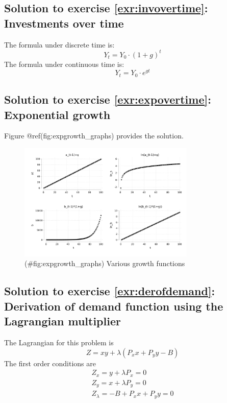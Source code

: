 \documentclass[
  12pt,
  oneside]{book}
\theoremstyle{definition}
\theoremstyle{definition}
\theoremstyle{definition}
\theoremstyle{definition}
\theoremstyle{remark}
\begin{document}
\subsection*{Solution to exercise \ref{exr:invovertime}: Investments over time}\label{sol:invovertime}

The formula under discrete time is:
\[
Y_t=Y_0\cdot (1+g)^t
\]
The formula under continuous time is:
\[
Y_t=Y_0\cdot e^{gt}
\]

\subsection*{Solution to exercise \ref{exr:expovertime}: Exponential growth}\label{sol:expovertime}

Figure @ref(fig:expgrowth\_graphs) provides the solution.

\begin{figure}
\centering
\includegraphics[width=0.75\textwidth,height=\textheight]{fig/expgrowth_graphs.png}
\caption{(\#fig:expgrowth\_graphs) Various growth functions}
\end{figure}

\subsection*{Solution to exercise \ref{exr:derofdemand}: Derivation of demand function using the Lagrangian multiplier}\label{sol:derofdemand}

The Lagrangian for this problem is
\[
  Z=x y+\lambda\left(P_{x} x+P_{y} y-B\right)
\]
The first order conditions are
\[
\begin{array}{l}
Z_{x}=y+\lambda P_{x}=0 \\
Z_{y}=x+\lambda P_{y}=0 \\
Z_{\lambda}=-B+P_{x} x+P_{y} y=0
\end{array}
\]
\end{document}
